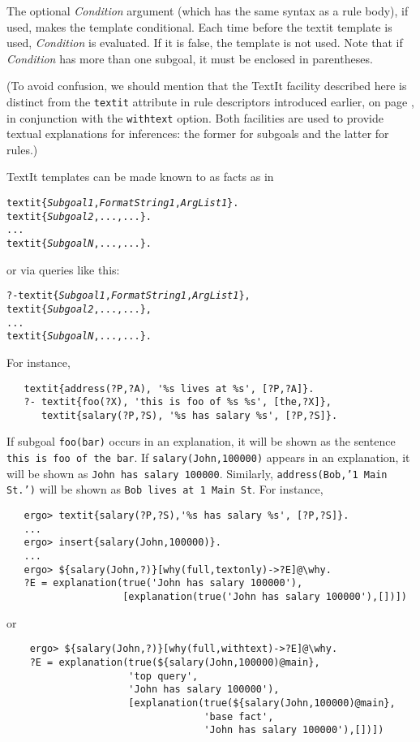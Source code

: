The optional \emph{Condition} argument (which has the same syntax as a rule
body), if used, makes the template
conditional. Each time before the textit template is used, \emph{Condition}
is evaluated. If it is false, the template is not used. Note that if
\emph{Condition} has more than one subgoal, it must be enclosed in
parentheses. 

\noindent
(To avoid confusion, we should mention that the TextIt facility described
here is distinct from the \texttt{textit} attribute in rule descriptors
introduced earlier, on page \pageref{page-textit}, in conjunction with the
\texttt{withtext} option. Both facilities are used to provide
textual explanations for \ERGO inferences: the former for subgoals and the
latter for rules.)


\noindent
TextIt templates can be made known to \ERGO as facts as in
\begin{alltt}
   textit\{\textnormal{\emph{Subgoal1},\emph{FormatString1},\emph{ArgList1}}\}.
   textit\{\textnormal{\emph{Subgoal2}},...,...\}.
   ...
   textit\{\textnormal{\emph{SubgoalN}},...,...\}.
\end{alltt}
or via queries like this:
\begin{alltt}
   ?- textit\{\textnormal{\emph{Subgoal1},\emph{FormatString1},\emph{ArgList1}}\},
      textit\{\textnormal{\emph{Subgoal2}},...,...\},
      ...
      textit\{\textnormal{\emph{SubgoalN}},...,...\}.
\end{alltt}

\noindent
For instance,
\begin{verbatim}
   textit{address(?P,?A), '%s lives at %s', [?P,?A]}.
   ?- textit{foo(?X), 'this is foo of %s %s', [the,?X]},
      textit{salary(?P,?S), '%s has salary %s', [?P,?S]}.
\end{verbatim}
If subgoal \texttt{foo(bar)} occurs in an explanation, it will be shown as
the sentence \texttt{this is foo of the bar}.
If \texttt{salary(John,100000)} appears in an explanation, it will be shown as
\texttt{John has salary 100000}. Similarly, \texttt{address(Bob,'1 Main
  St.')} will be shown as \texttt{Bob lives at 1 Main St}.    
For instance,
\begin{verbatim}
   ergo> textit{salary(?P,?S),'%s has salary %s', [?P,?S]}.
   ...
   ergo> insert{salary(John,100000)}.
   ...
   ergo> ${salary(John,?)}[why(full,textonly)->?E]@\why.
   ?E = explanation(true('John has salary 100000'),
                    [explanation(true('John has salary 100000'),[])])
\end{verbatim}
or
\begin{verbatim}
    ergo> ${salary(John,?)}[why(full,withtext)->?E]@\why.
    ?E = explanation(true(${salary(John,100000)@main},
                     'top query',
                     'John has salary 100000'),
                     [explanation(true(${salary(John,100000)@main},
                                  'base fact',
                                  'John has salary 100000'),[])])
\end{verbatim}

